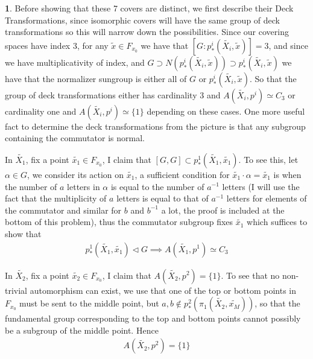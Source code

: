 \documentclass[10.5pt]{article}
\theoremstyle{definition}
\newtheorem{pb}{}
\newcommand{\set}[1]{\{#1\}}
\begin{document}
\begin{pb}
        Before showing that these 7 covers are distinct, we first describe their Deck Transformations, since isomorphic covers will have the same group of deck transformations so this will narrow down the possibilities. Since our covering spaces have index 3, for any \(\tilde{x} \in F_{x_0}\) we have that
        \([G:p^i_*(\tilde{X_i},\tilde{x})] = 3\), and since we have multiplicativity of index, and \(G \supset N(p^i_*(\tilde{X_i},\tilde{x})) \supset p^i_*(\tilde{X_i},\tilde{x})\) we have that the normalizer sungroup is either all of \(G\) or \(p^i_*(\tilde{X_i},\tilde{x})\). So that the group of deck transformations either has cardinality 3 and \(A(\tilde{X_i},p^i) \simeq C_3\) or cardinality one and \(A(\tilde{X_i},p^i) \simeq \set{1}\) depending on these cases. One more useful fact to determine the deck transformations from the picture is that any subgroup containing the commutator is normal.

        In \(\tilde{X_1}\), fix a point \(\tilde{x_1} \in F_{x_0}\), I claim that \([G,G] \subset p^1_*(\tilde{X_1},\tilde{x_1})\). To see this, let \(\alpha \in G\), we consider its action on \(\tilde{x_1}\), a sufficient condition for \(\tilde{x_1}\cdot \alpha = \tilde{x_1}\) is when the number of \(a\) letters in \(\alpha\) is equal to the number of \(a^{-1}\) letters (I will use the fact that the multiplicity of \(a\) letters is equal to that of \(a^{-1}\) letters for elements of the commutator and similar for \(b\) and \(b^{-1}\) a lot, the proof is included at the bottom of this problem), thus the commutator subgroup fixes \(\tilde{x_1}\) which suffices to show that
        \begin{align*}
            p^1_*(\tilde{X_1},\tilde{x_1}) \lhd G \implies A(\tilde{X_1},p^1) \simeq C_3
        \end{align*}

        In \(\tilde{X_2}\), fix a point \(\tilde{x_2} \in F_{x_0}\), I claim that \(A(\tilde{X_2},p^2) = \set{1}\). To see that no non-trivial automorphism can exist, we use that one of the top or bottom points in \(F_{x_0}\) must be sent to the middle point, but \(a,b \not \in p^2_*(\pi_1(\tilde{X_2},\tilde{x_M}))\), so that the fundamental group corresponding to the top and bottom points cannot possibly be a subgroup of the middle point. Hence
        \begin{align*}
            A(\tilde{X_2},p^2) = \set{1}
        \end{align*}


\end{pb}
\end{document}
